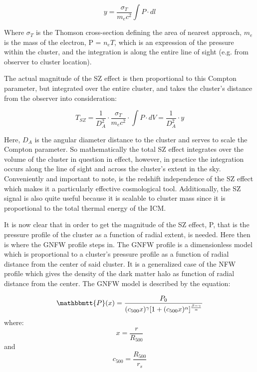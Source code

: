 \documentclass[12pt]{article} %
\begin{document}
\begin{equation}
y =\frac{\sigma_T}{m_e  c^2} \int P \cdot dl
\end{equation}

Where $\sigma_T$ is the Thomson cross-section defining the area of nearest approach, $m_e$ is the mass of the electron, P = $ n_e T$, which is an expression of the pressure within the cluster, and the integration is along the entire line of sight (e.g. from observer to cluster location). 

The actual magnitude of the SZ effect is then proportional to this Compton parameter, but integrated over the entire cluster, and takes the cluster’s distance from the observer into consideration:

\begin{equation}
T_{SZ} = \frac{1}{D^2_A} \cdotp \frac{\sigma_T}{m_e  c^2} \cdotp \int P \cdot dV =\frac{1}{D^2_A} \cdotp y 
\end{equation}

Here, $D_A$ is the angular diameter distance to the cluster and serves to scale the Compton parameter. So mathematically the total SZ effect integrates over the volume of the cluster in question in effect, however, in practice the integration occurs along the line of sight and across the cluster’s extent in the sky.  Conveniently and important to note, is the redshift independence of the SZ effect which makes it a particularly effective cosmological tool. Additionally, the SZ signal is also quite useful because it is scalable to cluster mass since it is proportional to the total thermal energy of the ICM.

It is now clear that in order to get the magnitude of the SZ effect, P, that is the pressure profile of the cluster as a function of radial extent, is needed. Here then is where the GNFW profile steps in. The GNFW profile is a dimensionless model which is proportional to a cluster’s pressure profile as a function of radial distance from the center of said cluster. It is a generalized case of the NFW profile which gives the density of the dark matter halo as function of radial distance from the center. The GNFW model is described by the equation: 

\begin{equation}
\mathbbmtt{P}(x)=\frac{P_0}{(c_{500}x)^\gamma [1 + (c_{500}x)^\alpha]^\frac{\beta - \gamma}{\alpha}} 
\end{equation}
where:
\begin{equation}
x = \frac{r}{R_{500}}
\end{equation}
and
\begin{equation}
c_{500} = \frac{R_{500}}{r_s}
\end{equation}
\end{document}
